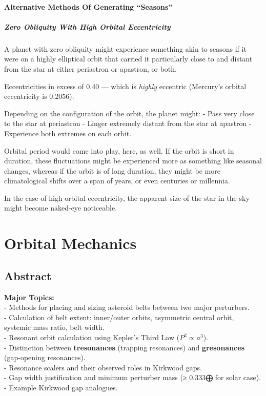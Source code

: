 \documentclass[
  letterpaper,
]{book}
\begin{document}
\subsection{Alternative Methods Of Generating
``Seasons''}\label{alternative-methods-of-generating-seasons}

\subsubsection{Zero Obliquity With High Orbital
Eccentricity}\label{zero-obliquity-with-high-orbital-eccentricity}

A planet with zero obliquity might experience something akin to seasons
if it were on a highly elliptical orbit that carried it particularly
close to and distant from the star at either periastron or apastron, or
both.

Eccentricities in excess of 0.40 --- which is \emph{highly} eccentric
(Mercury's orbital eccentricity is 0.2056).

Depending on the configuration of the orbit, the planet might: - Pass
very close to the star at periastron - Linger extremely distant from the
star at apastron - Experience both extremes on each orbit.

Orbital period would come into play, here, as well. If the orbit is
short in duration, these fluctuations might be experienced more as
something like seasonal changes, whereas if the orbit is of long
duration, they might be more climatological shifts over a span of years,
or even centuries or millennia.

In the case of high orbital eccentricity, the apparent size of the star
in the sky might become naked-eye noticeable.

\part{Orbital Mechanics}

\chapter{Abstract}\label{abstract-26}

\textbf{Major Topics:}\\
- Methods for placing and sizing asteroid belts between two major
perturbers.\\
- Calculation of belt extent: inner/outer orbits, asymmetric central
orbit, systemic mass ratio, belt width.\\
- Resonant orbit calculation using Kepler's Third Law
(\(P^2 \propto a^3\)).\\
- Distinction between \textbf{tresonances} (trapping resonances) and
\textbf{gresonances} (gap-opening resonances).\\
- Resonance scalers and their observed roles in Kirkwood gaps.\\
- Gap width justification and minimum perturber mass (≥ 0.333⨁ for solar
case).\\
- Example Kirkwood gap analogues.
\end{document}

